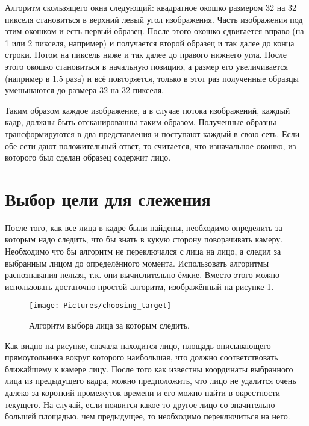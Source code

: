 \documentclass[12pt]{report}
\begin{document}
Алгоритм скользящего окна следующий: квадратное окошко размером 32 на 32 пикселя становиться в верхний левый угол 
изображения. Часть изображения под этим окошком и есть первый образец. После этого окошко сдвигается вправо (на 1 
или 
2 пикселя, например) и получается второй образец и так далее до конца строки. Потом на пиксель ниже и так далее до 
правого нижнего угла. После этого окошко становиться в начальную позицию, а размер его увеличивается (например в 
1.5 
раза) и всё повторяется, только в этот раз полученные образцы уменьшаются до размера 32 на 32 пикселя.

Таким образом каждое изображение, а в случае потока изображений, каждый кадр, должны быть отсканированны таким 
образом. 
Полученные образцы трансформируются в два представления и поступают каждый в свою сеть. Если обе сети дают 
положительный ответ, то считается, что изначальное окошко, из которого был сделан образец содержит лицо.

\section{Выбор цели для слежения}
После того, как все лица в кадре были найдены, необходимо определить за которым надо следить, что бы знать в кукую 
сторону поворачивать камеру. Необходимо что бы алгоритм не переключался с лица на лицо, а следил за выбранным 
лицом 
до определённого момента. Использовать алгоритмы распознавания нельзя, т.к. они вычислительно-ёмкие. Вместо этого 
можно использовать достаточно простой алгоритм, изображённый на рисунке \ref{fig:choosing_face}.

\begin{figure}[h]
	\centering
	\texttt{[image: Pictures/choosing\_target]}	
	\caption{Алгоритм выбора лица за которым следить.}
	\label{fig:choosing_face}
\end{figure}

Как видно на рисунке, сначала находится лицо, площадь описывающего прямоугольника вокруг которого наибольшая, что 
должно соответствовать ближайшему к камере лицу. После того как известны координаты выбранного лица из предыдущего 
кадра, можно предположить, что лицо не удалится очень далеко за короткий промежуток времени и его можно найти в 
окрестности текущего. На случай, если появится какое-то другое лицо со значительно большей площадью, чем 
предыдущее, 
то необходимо переключиться на него. 
\end{document}
